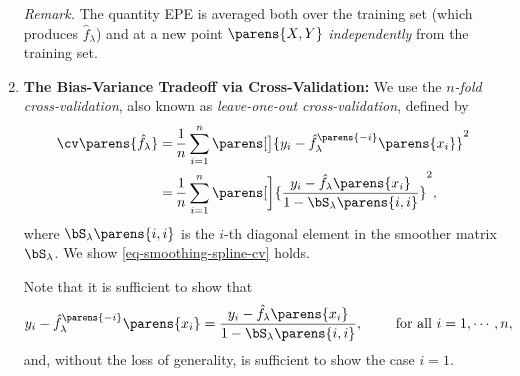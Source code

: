 \documentclass[12pt]{article}
\begin{document}
\begin{enumerate}[label=\textbf{\arabic*.}]
	\textit{Remark.} The quantity EPE is averaged both over the training set (which produces $\hat{f}_{\lambda}$) and at a new point $\parens{X, Y}$ \emph{independently} from the training set. 
	
	\item \textbf{The Bias-Variance Tradeoff via Cross-Validation:} We use the \textit{$n$-fold cross-validation}, also known as \textit{leave-one-out cross-validation}, defined by 
	\begin{align}
		\cv \parens{\hat{f}_{\lambda}} = & \, \frac{1}{n} \sum_{i=1}^n \parens[\big]{ y_i - \hat{f}_{\lambda}^{\parens{-i}} \parens{x_i} }^2 \nonumber \\ 
		= & \, \frac{1}{n} \sum_{i=1}^n \parens[\bigg]{ \frac{y_i - \hat{f}_{\lambda} \parens{x_i} }{1 - \bS_\lambda \parens{i,i}}}^2, \label{eq-smoothing-spline-cv}
	\end{align}
	where $\bS_\lambda \parens{i,i}$ is the $i$-th diagonal element in the smoother matrix $\bS_\lambda$. We show \eqref{eq-smoothing-spline-cv} holds. 
	
	Note that it is sufficient to show that 
	\begin{align*}
		y_i - \hat{f}_{\lambda}^{\parens{-i}} \parens{x_i} = \frac{y_i - \hat{f}_{\lambda} \parens{x_i} }{1 - \bS_\lambda \parens{i,i}}, \qquad \text{ for all } i = 1, \cdots, n, 
	\end{align*}
	and, without the loss of generality, is sufficient to show the case $i = 1$. 
	

\end{enumerate}
\end{document}
